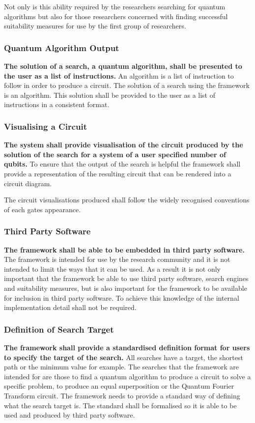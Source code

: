 \documentclass[authoryearcitations]{UoYCSproject}
\begin{document}
Not only is this ability required by the researchers searching for quantum algorithms but also for those researchers concerned with finding successful suitability measures for use by the first group of researchers.

\subsubsection{Quantum Algorithm Output}
\textbf{The solution of a search, a quantum algorithm, shall be presented to the user as a list of instructions.}
An algorithm is a list of instruction to follow in order to produce a circuit.
The solution of a search using the framework is an algorithm.
This solution shall be provided to the user as a list of instructions in a consistent format.

\subsubsection{Visualising a Circuit}
\textbf{The system shall provide visualisation of the circuit produced by the solution of the search for a system of a user specified number of qubits.}
To ensure that the output of the search is helpful the framework shall provide a representation of the resulting circuit that can be rendered into a circuit diagram.

The circuit visualisations produced shall follow the widely recognised conventions of each gates appearance.

\subsubsection{Third Party Software}
\textbf{The framework shall be able to be embedded in third party software.}
The framework is intended for use by the research community and it is not intended to limit the ways that it can be used.
As a result it is not only important that the framework be able to use third party software, search engines and suitability measures, but is also important for the framework to be available for inclusion in third party software.
To achieve this knowledge of the internal implementation detail shall not be required.

\subsubsection{Definition of Search Target}
\textbf{The framework shall provide a standardised definition format for users to specify the target of the search.}
All searches have a target, the shortest path or the minimum value for example.
The searches that the framework are intended for are those to find a quantum algorithm to produce a circuit to solve a specific problem, to produce an equal superposition or the Quantum Fourier Transform circuit.
The framework needs to provide a standard way of defining what the search target is.
The standard shall be formalised so it is able to be used and produced by third party software.
\end{document}
